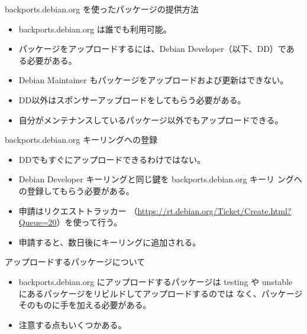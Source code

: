 
\begin{frame}[containsverbatim]{backports.debian.org を使ったパッケージの提供方法} 

\begin{itemize}
\item backports.debian.org は誰でも利用可能。
\item パッケージをアップロードするには、Debian Developer（以下、DD）であ
      る必要がある。
\item Debian Maintainer もパッケージをアップロードおよび更新はできない。
\item DD以外はスポンサーアップロードをしてもらう必要がある。
\item 自分がメンテナンスしているパッケージ以外でもアップロードできる。
\end{itemize}

\end{frame}

\begin{frame}[containsverbatim]{backports.debian.org キーリングへの登録}

\begin{itemize}
\item DDでもすぐにアップロードできるわけではない。
\item Debian Developer キーリングと同じ鍵を backports.debian.org キーリ
      ングへの登録してもらう必要がある。
\item 申請はリクエストトラッカー
（\url{https://rt.debian.org/Ticket/Create.html?Queue=20}）を使って行う。

\item 申請すると、数日後にキーリングに追加される。
\end{itemize}

\end{frame}


\begin{frame}[containsverbatim]{アップロードするパッケージについて}

\begin{itemize}
\item backports.debian.org にアップロードするパッケージは
 testing や unstable にあるパッケージをリビルドしてアップロードするのでは
なく、パッケージそのものに手を加える必要がある。
\item 注意する点もいくつかある。
\end{itemize}

\end{frame}




